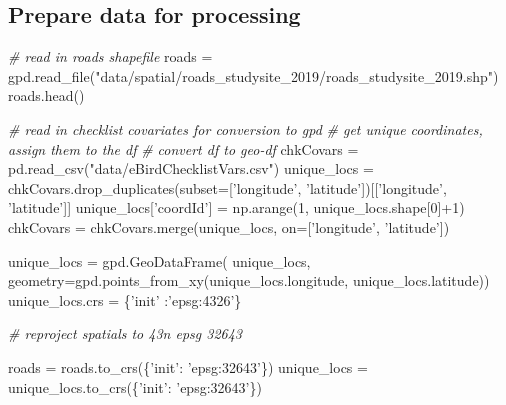 \documentclass[]{article}
\newenvironment{Shaded}{}{}
\newcommand{\CommentTok}[1]{\textcolor[rgb]{0.38,0.63,0.69}{\textit{#1}}}
\newcommand{\DecValTok}[1]{\textcolor[rgb]{0.25,0.63,0.44}{#1}}
\newcommand{\NormalTok}[1]{#1}
\newcommand{\OperatorTok}[1]{\textcolor[rgb]{0.40,0.40,0.40}{#1}}
\newcommand{\StringTok}[1]{\textcolor[rgb]{0.25,0.44,0.63}{#1}}
\begin{document}
\hypertarget{prepare-data-for-processing}{%
\subsection{Prepare data for processing}\label{prepare-data-for-processing}}

\begin{Shaded}
\begin{Highlighting}[]
\CommentTok{# read in roads shapefile}
\NormalTok{roads }\OperatorTok{=}\NormalTok{ gpd.read_file(}\StringTok{"data/spatial/roads_studysite_2019/roads_studysite_2019.shp"}\NormalTok{)}
\NormalTok{roads.head()}

\CommentTok{# read in checklist covariates for conversion to gpd}
\CommentTok{# get unique coordinates, assign them to the df}
\CommentTok{# convert df to geo-df}
\NormalTok{chkCovars }\OperatorTok{=}\NormalTok{ pd.read_csv(}\StringTok{"data/eBirdChecklistVars.csv"}\NormalTok{)}
\NormalTok{unique_locs }\OperatorTok{=}\NormalTok{ chkCovars.drop_duplicates(subset}\OperatorTok{=}\NormalTok{[}\StringTok{'longitude'}\NormalTok{,}
                                         \StringTok{'latitude'}\NormalTok{])[[}\StringTok{'longitude'}\NormalTok{, }\StringTok{'latitude'}\NormalTok{]]}
\NormalTok{unique_locs[}\StringTok{'coordId'}\NormalTok{] }\OperatorTok{=}\NormalTok{ np.arange(}\DecValTok{1}\NormalTok{, unique_locs.shape[}\DecValTok{0}\NormalTok{]}\OperatorTok{+}\DecValTok{1}\NormalTok{)}
\NormalTok{chkCovars }\OperatorTok{=}\NormalTok{ chkCovars.merge(unique_locs, on}\OperatorTok{=}\NormalTok{[}\StringTok{'longitude'}\NormalTok{, }\StringTok{'latitude'}\NormalTok{])}

\NormalTok{unique_locs }\OperatorTok{=}\NormalTok{ gpd.GeoDataFrame(}
\NormalTok{unique_locs,}
\NormalTok{geometry}\OperatorTok{=}\NormalTok{gpd.points_from_xy(unique_locs.longitude, unique_locs.latitude))}
\NormalTok{unique_locs.crs }\OperatorTok{=}\NormalTok{ \{}\StringTok{'init'}\NormalTok{ :}\StringTok{'epsg:4326'}\NormalTok{\}}

\CommentTok{# reproject spatials to 43n epsg 32643}

\NormalTok{roads }\OperatorTok{=}\NormalTok{ roads.to_crs(\{}\StringTok{'init'}\NormalTok{: }\StringTok{'epsg:32643'}\NormalTok{\})}
\NormalTok{unique_locs }\OperatorTok{=}\NormalTok{ unique_locs.to_crs(\{}\StringTok{'init'}\NormalTok{: }\StringTok{'epsg:32643'}\NormalTok{\})}



\end{Highlighting}
\end{Shaded}
\end{document}
